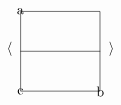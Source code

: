 \documentclass{article}
\begin{document}
$\langle \begin{tikzpicture}[baseline=(current bounding box.center)]
  \node[draw, rectangle, minimum width=2cm, minimum height=2cm] (box) {};
  \node at (box.north west) {a};
  \node at (box.south east) {b};
  \node at (box.south west) {c};
  \draw (box.west) -- (box.east);
\end{tikzpicture} \rangle$
\end{document}
